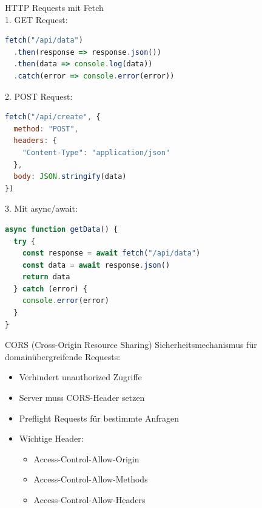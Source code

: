 \begin{KR}{HTTP Requests mit Fetch}\\
1. GET Request:
\begin{lstlisting}[language=JavaScript, style=basesmol]
fetch("/api/data")
  .then(response => response.json())
  .then(data => console.log(data))
  .catch(error => console.error(error))
\end{lstlisting}

2. POST Request:
\begin{lstlisting}[language=JavaScript, style=basesmol]
fetch("/api/create", {
  method: "POST",
  headers: {
    "Content-Type": "application/json"
  },
  body: JSON.stringify(data)
})
\end{lstlisting}

3. Mit async/await:
\begin{lstlisting}[language=JavaScript, style=basesmol]
async function getData() {
  try {
    const response = await fetch("/api/data")
    const data = await response.json()
    return data
  } catch (error) {
    console.error(error)
  }
}
\end{lstlisting}
\end{KR}



\begin{concept}{CORS (Cross-Origin Resource Sharing)}
    Sicherheitsmechanismus für domainübergreifende Requests:
    \begin{itemize}
        \item Verhindert unauthorized Zugriffe
        \item Server muss CORS-Header setzen
        \item Preflight Requests für bestimmte Anfragen
        \item Wichtige Header:
            \begin{itemize}
                \item Access-Control-Allow-Origin
                \item Access-Control-Allow-Methods
                \item Access-Control-Allow-Headers
            \end{itemize}
    \end{itemize}
\end{concept}

